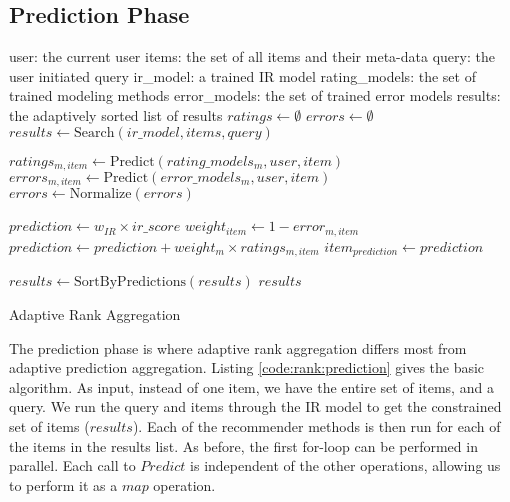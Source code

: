 \clearpage
\subsection{Prediction Phase}

\begin{algorithm}[t]
  \begin{algorithmic}[1]
  \REQUIRE user: the current user
  \REQUIRE items: the set of all items and their meta-data
  \REQUIRE query: the user initiated query
  \REQUIRE ir\_model: a trained IR model
  \REQUIRE rating\_models: the set of trained modeling methods 
  \REQUIRE error\_models: the set of trained error models
  \ENSURE  results: the adaptively sorted list of results
    \STATE $ratings \gets \emptyset$
    \STATE $errors  \gets \emptyset$
    \STATE $results \gets \mathrm{Search}(ir\_model, items, query)$
    
        \STATE $ratings_{m,item} \gets \mathrm{Predict}(rating\_models_m, user, item)$
        \STATE $errors_{m,item}  \gets \mathrm{Predict}(error\_models_m, user, item)$
      \ENDFOR 
    \ENDFOR
    \STATE $errors \gets \mathrm{Normalize}(errors)$

      \STATE $prediction \gets w_{IR} \times ir\_score$
        \STATE $weight_{item} \gets 1 - error_{m,item}$
        \STATE $prediction \gets prediction + weight_m \times ratings_{m,item}$
      \ENDFOR
      \STATE $item_{prediction} \gets prediction$
    \ENDFOR
    
    \STATE $results \gets \mathrm{SortByPredictions}(results)$
  \RETURN $results$

  \end{algorithmic}
  \caption[Adaptive Rank Aggregation]{Adaptive Rank Aggregation}
  \label{code:rank:prediction}
\end{algorithm}

The prediction phase is where adaptive rank aggregation differs most from adaptive prediction aggregation.
Listing \ref{code:rank:prediction} gives the basic algorithm.
As input, instead of one item, we have the entire set of items, and a query.
We run the query and items through the IR model to get the constrained set of items ($results$).
Each of the recommender methods is then run for each of the items in the results list.
As before, the first for-loop can be performed in parallel.
Each call to $Predict$ is independent of the other operations,
allowing us to perform it as a $map$ operation.

